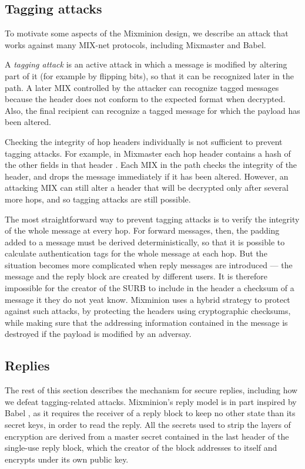 \documentclass[11pt]{IEEEtran}
\begin{document}
\subsection{Tagging attacks}
\label{subsec:tagging-attacks}

To motivate some aspects of the Mixminion design, we describe an attack
that works against many MIX-net protocols, including Mixmaster and Babel.

A {\em tagging attack} is an active attack in which a message is
modified by altering part of it (for example by flipping bits), so
that it can be recognized later in the path.  A later MIX controlled by
the attacker can recognize tagged messages because the header does
not conform to the expected format when decrypted.  Also, the final
recipient can recognize a tagged message for which the payload has
been altered.

Checking the integrity of hop headers individually is not
sufficient to prevent tagging attacks.  For example, in Mixmaster
each hop header contains a hash of the other fields in that header
\cite{mixmaster-spec}.
Each MIX in the path checks the integrity of the header, and drops
the message immediately if it has been altered.  However, 
an attacking MIX can still alter a header that will be decrypted
only after several more hops, and so tagging attacks are still possible.

The most straightforward way to prevent tagging attacks is to
verify the integrity of the whole message at every hop.  For forward messages,
then, the padding added to a message must be derived deterministically,
so that it is possible to calculate
authentication tags for the whole message at each hop.  But
the situation becomes more complicated when reply messages are
introduced --- the message and the reply block are
created by different users. It is therefore impossible for the creator
of the SURB to include in the header a checksum of a message it they
do not yeat know. Mixminion uses a hybrid strategy to protect against
such attacks, by protecting the headers using cryptographic checksums,
while making sure that the addressing information contained in the
message is destroyed if the payload is modified by an adversay.

\subsection{Replies}
\label{subsec:replies}

The rest of this section describes the mechanism for secure replies,
including how we defeat tagging-related attacks. Mixminion's reply
model is in part inspired by Babel \cite{babel}, as it requires the
receiver of a reply block to keep no other state than its secret keys,
in order to read the reply.  All the secrets used
to strip the layers of encryption are derived from a master
secret contained in the last header of the single-use reply block, which
the creator of the block addresses to itself and encrypts under its
own public key.
\end{document}
